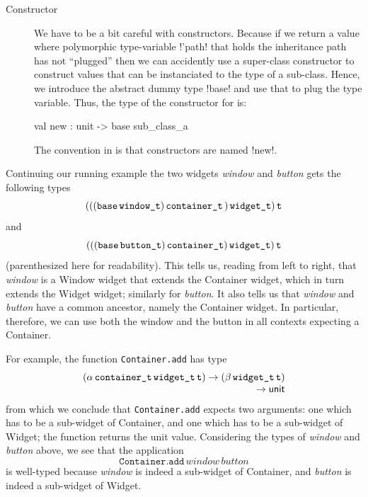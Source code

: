 \documentclass[workingdraft,endnotes]{usetex-v1}
\begin{document}
\begin{description}
\item[Constructor] We have to be a bit careful with constructors.
  Because if we return a value where polymorphic type-variable !'path!
  that holds the inheritance path has not ``plugged'' then we can
  accidently use a super-class constructor to construct values that
  can be instanciated to the type of a sub-class.  Hence, we introduce
  the abstract dummy type !base! and use that to plug the type
  variable.  Thus, the type of the constructor for
   is:
\begin{SMLcode}
  val new : unit -> base sub_class_a
\end{SMLcode}
The convention in \gtk is that constructors are named !new!.
\end{description}
 
Continuing our running example the two widgets
\textit{window} and \textit{button} gets the following
types
\begin{displaymath}
(((\texttt{base}\,{\texttt{window\_t}})\,{\texttt{container\_t}}\,{)}\,{\texttt{widget\_t}})\,{\texttt{t}}
\end{displaymath}
and
\begin{displaymath}
(((\texttt{base}\,{\texttt{button\_t}})\,{\texttt{container\_t}})\,{\texttt{widget\_t}})\,{\texttt{t}}
\end{displaymath}
(parenthesized here for readability). This tells us, reading from left
to right, that \textit{window} is a Window widget that extends the
Container widget, which in turn extends the Widget widget; similarly
for \textit{button}. It also tells us that \textit{window} and
\textit{button} have a common ancestor, namely the Container widget.
In particular, therefore, we can use both the window and the button in
all contexts expecting a Container.

For example, the function \texttt{Container.add} has type
\begin{displaymath}\begin{array}{l}
(\tApp{\tApp{\tApp{\alpha}{\tWitness{container}}}{\tWitness{widget}}}{\tName{t}})
\rightarrow
(\tApp{\tApp{\beta}{\tWitness{widget}}}{\tName{t}})
\\
\multicolumn{1}{r}{\rightarrow{\tUnit}}
\end{array}\end{displaymath}
from which we conclude that \texttt{Container.add} expects two arguments:
one which has to be a sub-widget of Container, and one which has to be
a sub-widget of Widget; the function returns the unit value. Considering
the types of \textit{window} and \textit{button} above, we see that
the application
\begin{displaymath}
\texttt{Container.add}\,\textit{window}\,\textit{button}
\end{displaymath}
is well-typed because \textit{window} is indeed a sub-widget of 
Container, and \textit{button} is indeed a sub-widget of Widget.
\end{document}
